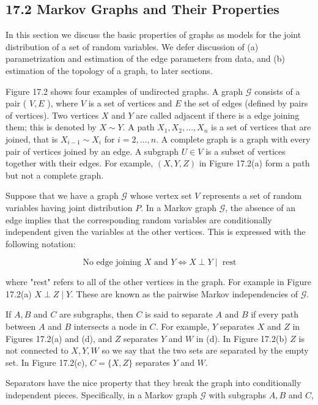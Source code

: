 \documentclass[10pt]{article}
\begin{document}
\subsection*{17.2 Markov Graphs and Their Properties}
In this section we discuss the basic properties of graphs as models for the joint distribution of a set of random variables. We defer discussion of (a) parametrization and estimation of the edge parameters from data, and (b) estimation of the topology of a graph, to later sections.

Figure 17.2 shows four examples of undirected graphs. A graph $\mathcal{G}$ consists of a pair ( $V, E$ ), where $V$ is a set of vertices and $E$ the set of edges (defined by pairs of vertices). Two vertices $X$ and $Y$ are called adjacent if there is a edge joining them; this is denoted by $X \sim Y$. A path $X_{1}, X_{2}, \ldots, X_{n}$ is a set of vertices that are joined, that is $X_{i-1} \sim X_{i}$ for $i=2, \ldots, n$. A complete graph is a graph with every pair of vertices joined by an edge. A subgraph $U \in V$ is a subset of vertices together with their edges. For example, $(X, Y, Z)$ in Figure 17.2(a) form a path but not a complete graph.

Suppose that we have a graph $\mathcal{G}$ whose vertex set $V$ represents a set of random variables having joint distribution $P$. In a Markov graph $\mathcal{G}$, the absence of an edge implies that the corresponding random variables are conditionally independent given the variables at the other vertices. This is expressed with the following notation:


\begin{equation*}
\text { No edge joining } X \text { and } Y \Longleftrightarrow X \perp Y \mid \text { rest } \tag{17.1}
\end{equation*}


where "rest" refers to all of the other vertices in the graph. For example in Figure 17.2(a) $X \perp Z \mid Y$. These are known as the pairwise Markov independencies of $\mathcal{G}$.

If $A, B$ and $C$ are subgraphs, then $C$ is said to separate $A$ and $B$ if every path between $A$ and $B$ intersects a node in $C$. For example, $Y$ separates $X$ and $Z$ in Figures 17.2(a) and (d), and $Z$ separates $Y$ and $W$ in (d). In Figure 17.2(b) $Z$ is not connected to $X, Y, W$ so we say that the two sets are separated by the empty set. In Figure 17.2(c), $C=\{X, Z\}$ separates $Y$ and $W$.

Separators have the nice property that they break the graph into conditionally independent pieces. Specifically, in a Markov graph $\mathcal{G}$ with subgraphs $A, B$ and $C$,
\end{document}
